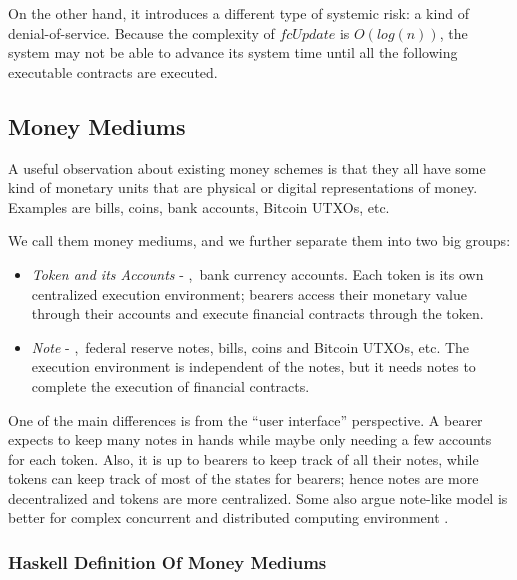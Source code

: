 On the other hand, it introduces a different type of systemic risk: a kind of
denial-of-service. Because the complexity of $fcUpdate$ is $O(log(n))$, the system may not be able
to advance its system time until all the following executable contracts are executed.

\subsection{Money Mediums}

\begin{displayquote}
A useful observation about existing money schemes is that they all have some kind of monetary units
that are physical or digital representations of money. Examples are bills, coins, bank accounts,
Bitcoin UTXOs, etc. 
\end{displayquote}

We call them money mediums, and we further separate them into two big groups:

\begin{itemize}
    \item \textit{Token and its Accounts} - \eg,\ bank currency accounts. Each token is its own
centralized execution environment; bearers access their monetary value through their accounts and
execute financial contracts through the token.

    \item \textit{Note} - \eg,\ federal reserve notes, bills, coins and Bitcoin UTXOs, etc. The
execution environment is independent of the notes, but it needs notes to complete the execution of
financial contracts.
\end{itemize}

One of the main differences is from the ``user interface'' perspective. A bearer expects to keep
many notes in hands while maybe only needing a few accounts for each token. Also, it is up to bearers
to keep track of all their notes, while tokens can keep track of most of the states for bearers;
hence notes are more decentralized and tokens are more centralized. Some also argue note-like model
is better for complex concurrent and distributed computing environment
.

\subsubsection{Haskell Definition Of Money Mediums}


